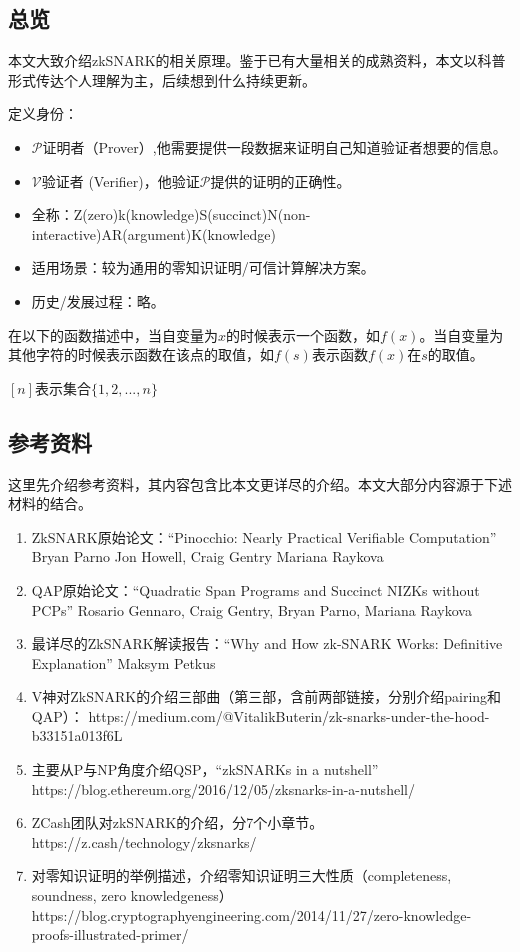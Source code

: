 \documentclass[12pt]{article}
\newcommand{\zk}{zkSNARK}
\newcommand{\pp}{$\mathcal{P}$}
\newcommand{\vv}{$\mathcal{V}$}
\begin{document}
\subsection{总览}
本文大致介绍zkSNARK的相关原理。鉴于已有大量相关的成熟资料，本文以科普形式传达个人理解为主，后续想到什么持续更新。

定义身份：
\begin{itemize}
\item \pp 证明者（Prover）,他需要提供一段数据来证明自己知道验证者想要的信息。
\item \vv 验证者 (Verifier)，他验证\pp 提供的证明的正确性。
\end{itemize}

\begin{itemize}
	\item 全称：Z(zero)k(knowledge)S(succinct)N(non-interactive)AR(argument)K(knowledge)
	\item 适用场景：较为通用的零知识证明/可信计算解决方案。
	\item 历史/发展过程：略。
\end{itemize}

在以下的函数描述中，当自变量为$x$的时候表示一个函数，如$f(x)$。当自变量为其他字符的时候表示函数在该点的取值，如$f(s)$表示函数$f(x)$在$s$的取值。

$[n]$表示集合$\{1,2,...,n\}$
\subsection{参考资料}
这里先介绍参考资料，其内容包含比本文更详尽的介绍。本文大部分内容源于下述材料的结合。
\begin{enumerate}
	\item ZkSNARK原始论文：“Pinocchio: Nearly Practical Verifiable Computation”	Bryan Parno Jon Howell, Craig Gentry Mariana Raykova
	\item QAP原始论文：“Quadratic Span Programs and Succinct NIZKs without PCPs” Rosario Gennaro, Craig Gentry, Bryan Parno, Mariana Raykova
	\item 最详尽的ZkSNARK解读报告：“Why and How zk-SNARK Works: Definitive Explanation”	Maksym Petkus
	\item V神对ZkSNARK的介绍三部曲（第三部，含前两部链接，分别介绍pairing和QAP）：
	\newline
	https://medium.com/@VitalikButerin/zk-snarks-under-the-hood-b33151a013f6L
	\item 主要从P与NP角度介绍QSP，“zkSNARKs in a nutshell”
	\newline
	https://blog.ethereum.org/2016/12/05/zksnarks-in-a-nutshell/
	\item ZCash团队对\zk 的介绍，分7个小章节。
		\newline
	https://z.cash/technology/zksnarks/
	\item 对零知识证明的举例描述，介绍零知识证明三大性质（completeness, soundness, zero knowledgeness）
	\newline
	https://blog.cryptographyengineering.com/2014/11/27/zero-knowledge-proofs-illustrated-primer/
\end{enumerate}
\end{document}
